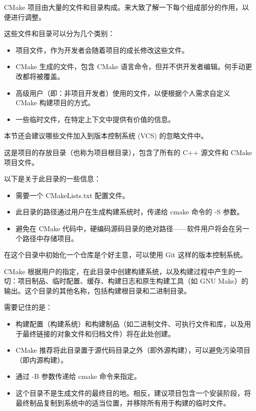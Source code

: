 CMake 项目由大量的文件和目录构成。来大致了解一下每个组成部分的作用，以便进行调整。

这些文件和目录可以分为几个类别：

\begin{itemize}
\item
项目文件，作为开发者会随着项目的成长修改这些文件。

\item
CMake 生成的文件，包含 CMake 语言命令，但并不供开发者编辑。何手动更改都将被覆盖。

\item
高级用户（即：非项目开发者）使用的文件，以便根据个人需求自定义 CMake 构建项目的方式。

\item
一些临时文件，在特定上下文中提供有价值的信息。
\end{itemize}

本节还会建议哪些文件加入到版本控制系统 (VCS) 的忽略文件中。


这是项目的存放目录（也称为项目根目录），包含了所有的 C++ 源文件和 CMake 项目文件。

以下是关于此目录的一些信息：

\begin{itemize}
\item
需要一个 CMakeLists.txt 配置文件。

\item
此目录的路径通过用户在生成构建系统时，传递给 cmake 命令的 -S 参数。

\item
避免在 CMake 代码中，硬编码源码目录的绝对路径——软件用户将会在另一个路径中存储项目。
\end{itemize}

在这个目录中初始化一个仓库是个好主意，可以使用 Git 这样的版本控制系统。


CMake 根据用户的指定，在此目录中创建构建系统，以及构建过程中产生的一切：项目制品、临时配置、缓存、构建日志和原生构建工具（如 GNU Make）的输出。这个目录的其他名称，包括构建根目录和二进制目录。

需要记住的是：

\begin{itemize}
\item
构建配置（构建系统）和构建制品（如二进制文件、可执行文件和库，以及用于最终链接的对象文件和归档文件）将在此处创建。

\item
CMake 推荐将此目录置于源代码目录之外（即外源构建），可以避免污染项目（即内源构建）。

\item
通过 -B 参数传递给 cmake 命令来指定。

\item
这个目录不是生成文件的最终目的地。相反，建议项目包含一个安装阶段，将最终制品复制到系统中的适当位置，并移除所有用于构建的临时文件。
\end{itemize}


